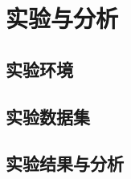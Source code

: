 

\chapter{实验与分析}
\label{cha:experiments_analysis}
\section{实验环境}
\section{实验数据集}
\section{实验结果与分析}

